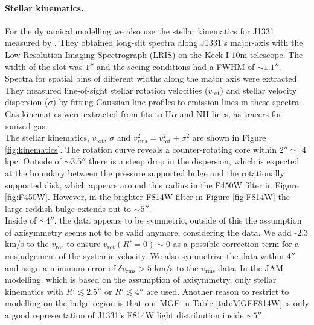 \paragraph{Stellar kinematics.} For the dynamical modelling we also use the stellar kinematics for J1331 measured by \citet{SWELLSV}. They obtained long-slit spectra along J1331's major-axis with the Low Resolution Imaging Spectrograph (LRIS) on the Keck I 10m telescope. The width of the slot was $1''$ and the seeing conditions had a FWHM of $\sim 1.1''$. Spectra for spatial bins of different widths along the major axis were extracted. They measured line-of-sight stellar rotation velocities ($v_\text{rot}$) and stellar velocity dispersion ($\sigma$) by fitting Gaussian line profiles to emission  lines in these spectra . Gas kinematics were extracted from fits to H$\alpha$ and NII lines, as tracers for ionized gas.
\\The stellar kinematics, $v_\text{rot}$, $\sigma$ and $v_\text{rms}^2=v_\text{rot}^2 + \sigma^2$ are shown in Figure \ref{fig:kinematics}. The rotation curve reveals a counter-rotating core within $2''\simeq$ 4 kpc. Outside of $\sim 3.5''$ there is a steep drop in the dispersion, which is expected at the boundary between the pressure supported bulge and the rotationally supported disk, which appears around this radius in the F450W filter in Figure \ref{fig:F450W}. However, in the brighter F814W filter in Figure \ref{fig:F814W}  the large reddish bulge extends out to $\sim5''$. 
\\Inside of $\sim 4''$, the data appears to be symmetric, outside of this the assumption of axisymmetry seems not to be valid anymore, considering the data. We add -2.3 km/s to the $v_\text{rot}$ to ensure $v_\text{rot}(R'=0) \sim 0$ as a possible correction term for a misjudgement of the systemic velocity. We also symmetrize the data within $4''$ and asign a minimum error of $\delta v_\text{rms} > 5$ km/s to the $v_\text{rms}$ data. In the JAM modelling, which is based on the assumption of axisymmetry, only stellar kinematics with $R'  \lesssim 2.5''$ or $R' \lesssim 4''$ are used. Another reason to restrict to modelling on the bulge region is that our MGE in Table \ref{tab:MGEF814W} is only a good representation of J1331's F814W light distribution inside $\sim 5''$.\\